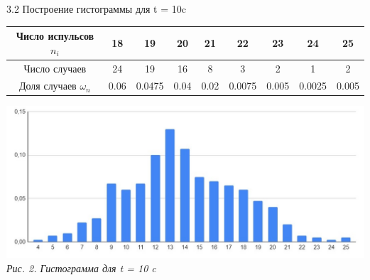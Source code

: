 \documentclass[12pt, a4paper]{article}
\begin{document}
          {\large 3.2 Построение гистограммы для t = 10c \\}

          \begin{center}
            \begin{tabular}{ |c|c|c|c|c|c|c|c|c| } \hline
            Число испульсов $n_i$ & 18 & 19 & 20 & 21 & 22 & 23 & 24 & 25 \\ \hline 
            Число случаев & 24 & 19 & 16 & 8 & 3 & 2 & 1 & 2 \\ \hline 
            Доля случаев $\omega_n$ & 0.06 & 0.0475 & 0.04 & 0.02 & 0.0075 & 0.005 & 0.0025 & 0.005 \\ \hline
            \end{tabular}
            \end{center} 

            \begin{minipage}[c]{\textwidth}
                \begin{center}
                    \includegraphics[scale=0.7]{Pics/hist1.jpg} \\
                    \textit{\textcolor[HTML]{000000}{Рис. 2. Гистограмма для t = 10 c}}
                \end{center}
            \end{minipage}
    
            \vspace*{0.6cm}
\end{document}
